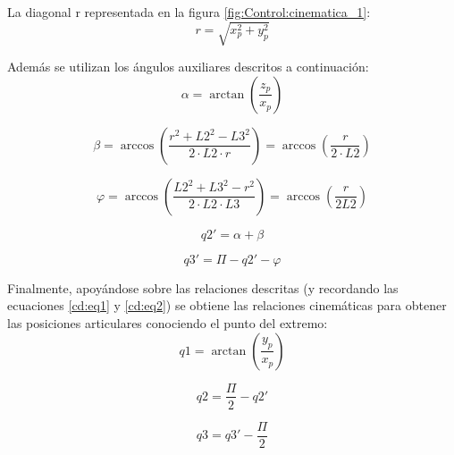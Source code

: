 	La diagonal r representada en la figura \ref{fig:Control:cinematica_1}:
	\begin{equation}
	\label{ci:eq31}
	r = \sqrt{x_p^2+y_p^2}
	\end{equation}
	
	
	Además se utilizan los ángulos auxiliares descritos a continuación:
	\begin{equation}
	\label{ci:eq3}
	\alpha = \arctan\left(\frac{z_p}{x_p}\right)
	\end{equation}
	
	\begin{equation}
	\label{ci:eq4}
	\beta = \arccos\left(\frac{r^2+L2^2-L3^2}{2 \cdot L2 \cdot r}\right) = \arccos\left(\frac{r}{2 \cdot L2}\right)
	\end{equation}
	
	\begin{equation}
	\label{ci:eq5}
	\varphi = \arccos\left(\frac{L2^2+L3^2-r^2}{2 \cdot L2 \cdot L3}\right) = \arccos\left(\frac{r}{2L2}\right)
	\end{equation}
	
	\begin{equation}
	\label{ci:eq6}
		q2' = \alpha + \beta
	\end{equation}
	
	\begin{equation}
	\label{ci:eq7}
		q3' = \varPi - q2' - \varphi
	\end{equation}
	
	Finalmente, apoyándose sobre las relaciones descritas (y recordando las ecuaciones \ref{cd:eq1} y \ref{cd:eq2}) se obtiene las relaciones cinemáticas para obtener las posiciones articulares conociendo el punto del extremo: 
	 \begin{equation}
	 \label{ci:eq8}
	 q1 = \arctan\left(\frac{y_p}{x_p}\right)
	 \end{equation}
	 
	 \begin{equation}
	 \label{ci:eq9}
	 q2 = \frac{\varPi}{2} - q2'
	 \end{equation}
	 
	 \begin{equation}
	 \label{ci:eq10}
	 q3 = q3'- \frac{\varPi}{2}
	 \end{equation}
